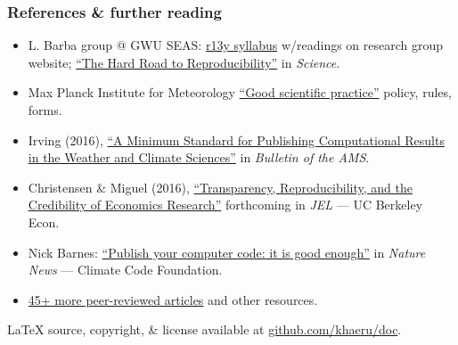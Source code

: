 \documentclass[12pt,aspectratio=169]{beamer}
\begin{document}
\begin{frame}[allowframebreaks]
\frametitle{References \& further reading}

\nocite{huppmann-2020}
\printbibliography[heading=none]

\begin{itemize}
  \small
  \item L. Barba group @ GWU SEAS: \href{http://lorenabarba.com/blog/barbagroup-reproducibility-syllabus/}{r13y syllabus} w/readings on research group website; \href{http://science.sciencemag.org/content/354/6308/142}{``The Hard Road to Reproducibility''} in \emph{Science}.
  \item Max Planck Institute for Meteorology \href{http://mpimet.mpg.de/en/science/publications/good-scientific-practice.html}{``Good scientific practice''} policy, rules, forms.
  \item Irving (2016), \href{http://journals.ametsoc.org/doi/abs/10.1175/BAMS-D-15-00010.1}{``A Minimum Standard for Publishing Computational Results in the Weather and Climate Sciences''} in \emph{Bulletin of the AMS}.
  \item Christensen \& Miguel (2016), \href{http:/dx.doi.org/10.3386/w22989}{``Transparency, Reproducibility, and the Credibility of Economics Research''} forthcoming in \emph{JEL} — UC Berkeley Econ.
  \item Nick Barnes: \href{https://www.nature.com/news/2010/101013/full/467753a.html}{``Publish your computer code: it is good enough''} in \emph{Nature News} — Climate Code Foundation.
  \item \href{http://ropensci.github.io/reproducibility-guide/sections/references/}{45+ more peer-reviewed articles} and other resources.
\end{itemize}

\medskip
{}

LaTeX source, copyright, \& license available at \href{https://github.com/khaeru/doc/}{github.com/khaeru/doc}.
\medskip

\end{frame}
\end{document}
